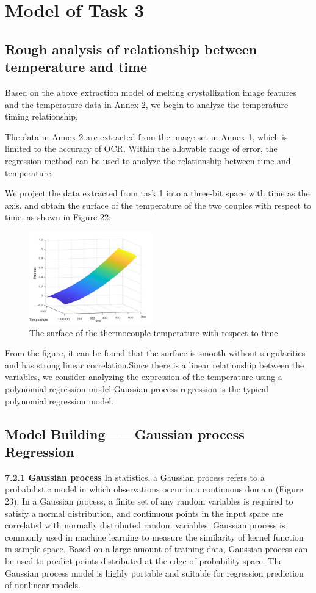 \documentclass{apmcmthesis}
\begin{document}
	
\section{Model of Task 3}
	\subsection{Rough analysis of relationship between temperature and time}
Based on the above extraction model of melting crystallization image features and the temperature data in Annex 2, we begin to analyze the temperature timing relationship.

The data in Annex 2 are extracted from the image set in Annex 1, which is limited to the accuracy of OCR. Within the allowable range of error, the regression method can be used to analyze the relationship between time and temperature.



We project the data extracted from task 1 into a three-bit space with time as the axis, and obtain the surface of the temperature of the two couples with respect to time, as shown in Figure 22:
	
			
	\begin{figure}[htbp!]
		\centering
		\includegraphics[height=4cm]{./figures/7-1.jpg}
		\caption{The surface of the thermocouple temperature with respect to time}
	\end{figure}


From the figure, it can be found that the surface is smooth without singularities and has strong linear correlation.Since there is a linear relationship between the variables, we consider analyzing the expression of the temperature using a polynomial regression model-Gaussian process regression is the typical polynomial regression model.
\subsection{Model Building——Gaussian process Regression}
	 \noindent\textbf{7.2.1 Gaussian process}
	In statistics, a Gaussian process refers to a probabilistic model in which observations occur in a continuous domain (Figure 23).  In a Gaussian process, a finite set of any random variables is required to satisfy a normal distribution, and continuous points in the input space are correlated with normally distributed random variables.  Gaussian process is commonly used in machine learning to measure the similarity of kernel function in sample space.  Based on a large amount of training data, Gaussian process can be used to predict points distributed at the edge of probability space.  The Gaussian process model is highly portable and suitable for regression prediction of nonlinear models.
	
\end{document}
